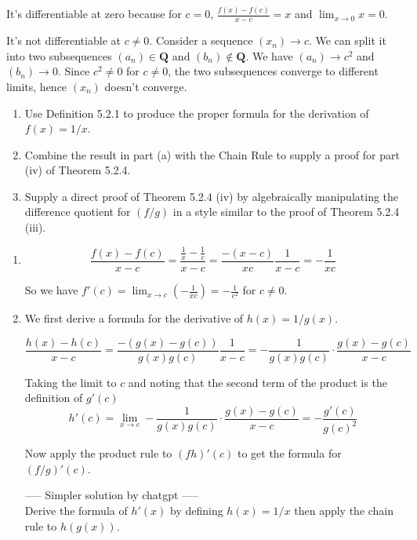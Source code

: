 \documentclass{oxmathproblems}
\begin{document}
\begin{questions}
\begin{solution}
\begin{enumerate}[label=(\alph*)]
    It's differentiable at zero because for $c= 0$, $\frac{f(x)-f(c)}{x-c} = x$ and $\lim_{x \to 0} x = 0$.

    It's not differentiable at $c \neq 0$. Consider a sequence $(x_{n}) \to c$. We can split it into two subsequences $(a_{n}) \in \textbf{Q}$ and $(b_{n}) \notin \textbf{Q}$. We have
    $(a_{n}) \to c^2$ and $(b_{n}) \to 0$. Since $c^2 \neq 0$ for $c \neq 0$, the two subsequences converge to different limits, hence $(x_{n})$ doesn't converge.
  \end{enumerate}
\end{solution}

\miquestion
\begin{enumerate}[label=(\alph*)]
  \item Use Definition 5.2.1 to produce the proper formula for the derivation of $f(x)=1/x$.
  \item Combine the result in part (a) with the Chain Rule to supply a proof for part (iv) of Theorem 5.2.4.
  \item Supply a direct proof of Theorem 5.2.4 (iv) by algebraically manipulating the difference quotient for $(f/g)$ in a style similar to the proof of Theorem 5.2.4 (iii).
\end{enumerate}

\begin{solution}
  \begin{enumerate}[label=(\alph*)]
    \item \[\frac{f(x)-f(c)}{x-c}=\frac{\frac{1}{x}-\frac{1}{c}}{x-c}=\frac{-(x-c)}{xc}\frac{1}{x-c}=-\frac{1}{xc}\]

    So we have $f'(c)=\lim_{x \to c}(-\frac{1}{xc})=-\frac{1}{c^2}$ for $c \neq 0$.

    \item We first derive a formula for the derivative of $h(x)=1/g(x)$.
    
    \[\frac{h(x)-h(c)}{x-c}=\frac{-(g(x)-g(c))}{g(x)g(c)}\frac{1}{x-c}=-\frac{1}{g(x)g(c)} \cdot \frac{g(x)-g(c)}{x-c}\]

    Taking the limit to $c$ and noting that the second term of the product is the definition of $g'(c)$
    \[h'(c) = \lim_{x \to c} -\frac{1}{g(x)g(c)} \cdot \frac{g(x)-g(c)}{x-c} = -\frac{g'(c)}{g(c)^2}\]

    Now apply the product rule to $(fh)'(c)$ to get the formula for $(f/g)'(c)$.

    ----- Simpler solution by chatgpt -----\\
    Derive the formula of $h'(x)$ by defining $h(x)=1/x$ then apply the chain rule to $h(g(x))$.


\end{enumerate}
\end{solution}
\end{questions}
\end{document}
